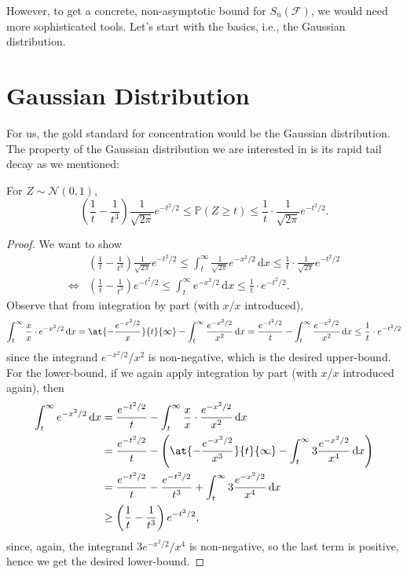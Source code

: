However, to get a concrete, non-asymptotic bound for \(S_n(\mathscr{F} )\), we would need more sophisticated tools. Let's start with the basics, i.e., the Gaussian distribution.

\section{Gaussian Distribution}
For us, the gold standard for concentration would be the Gaussian distribution. The property of the Gaussian distribution we are interested in is its rapid tail decay as we mentioned:

\begin{lemma}\label{lma:Gaussian-tail-bound}
	For \(Z \sim \mathcal{N} (0, 1)\),
	\[
		\left( \frac{1}{t} - \frac{1}{t^3} \right) \frac{1}{\sqrt{2\pi } } e^{- t^2 / 2} \leq \mathbb{P}(Z \geq t) \leq \frac{1}{t} \cdot \frac{1}{\sqrt{2\pi } } e^{- t^2 / 2}.
	\]
\end{lemma}
\begin{proof}
	We want to show
	\[
		\begin{split}
			     & \left( \frac{1}{t} - \frac{1}{t^3} \right) \frac{1}{\sqrt{2\pi } } e^{-t^2 / 2}
			\leq \int_{t}^{\infty} \frac{1}{\sqrt{2\pi } } e^{- x^2 / 2} \,\mathrm{d}x
			\leq \frac{1}{t}\cdot \frac{1}{\sqrt{2\pi } } e^{-t^2 / 2}                             \\
			\iff & \left( \frac{1}{t} - \frac{1}{t^3} \right) e^{-t^2 / 2}
			\leq \int_{t}^{\infty} e^{- x^2 / 2} \,\mathrm{d}x
			\leq \frac{1}{t}\cdot e^{-t^2 / 2}.
		\end{split}
	\]
	Observe that from integration by part (with \(x / x\) introduced),
	\[
		\int_{t}^{\infty} \frac{x}{x}\cdot e^{-x^2 / 2} \,\mathrm{d}x
		= \at{- \frac{e^{-x^2 / 2}}{x}}{t}{\infty } - \int_{t}^{\infty} \frac{e^{-x^2 / 2}}{x^2} \,\mathrm{d}x
		= \frac{e^{-t^2 / 2}}{t} - \int_{t}^{\infty} \frac{e^{-x^2 / 2}}{x^2} \,\mathrm{d}x
		\leq \frac{1}{t}\cdot e^{-t^2 / 2}
	\]
	since the integrand \(e^{-x^2 / 2} / x^2\) is non-negative, which is the desired upper-bound. For the lower-bound, if we again apply integration by part (with \(x / x\) introduced again), then
	\[
		\begin{split}
			\int_{t}^{\infty} e^{-x^2 / 2} \,\mathrm{d}x
			 & = \frac{e^{-t^2 / 2}}{t} - \int_{t}^{\infty} \frac{x}{x} \cdot \frac{e^{-x^2 / 2}}{x^2} \,\mathrm{d}x                                              \\
			 & = \frac{e^{-t^2 / 2}}{t} - \left( \at{- \frac{e^{-x^2 / 2}}{x^3}}{t}{\infty } - \int_{t}^{\infty} 3 \frac{e^{-x^2 / 2}}{x^4} \,\mathrm{d}x \right) \\
			 & = \frac{e^{-t^2 / 2}}{t} - \frac{e^{-t^2 / 2}}{t^3} + \int_{t}^{\infty} 3 \frac{e^{-x^2 / 2}}{x^4} \,\mathrm{d}x                                   \\
			 & \geq \left( \frac{1}{t} - \frac{1}{t^3} \right) e^{-t^2 / 2},
		\end{split}
	\]
	since, again, the integrand \(3 e^{-x^2 / 2} / x^4\) is non-negative, so the last term is positive, hence we get the desired lower-bound.
\end{proof}

